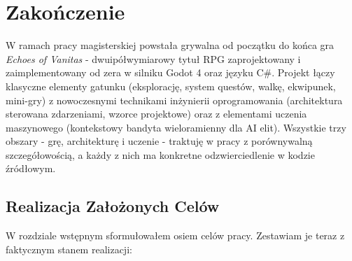 \chapter{Zakończenie}

W ramach pracy magisterskiej powstała grywalna od początku do końca gra \textit{Echoes of Vanitas} - dwuipółwymiarowy tytuł RPG zaprojektowany i zaimplementowany od zera w silniku Godot 4 oraz języku C\#. Projekt łączy klasyczne elementy gatunku (eksplorację, system questów, walkę, ekwipunek, mini-gry) z nowoczesnymi technikami inżynierii oprogramowania (architektura sterowana zdarzeniami, wzorce projektowe) oraz z elementami uczenia maszynowego (kontekstowy bandyta wieloramienny dla AI elit). Wszystkie trzy obszary - grę, architekturę i uczenie - traktuję w pracy z porównywalną szczegółowością, a każdy z nich ma konkretne odzwierciedlenie w kodzie źródłowym.

\section{Realizacja Założonych Celów}

W rozdziale wstępnym sformułowałem osiem celów pracy. Zestawiam je teraz z faktycznym stanem realizacji:

